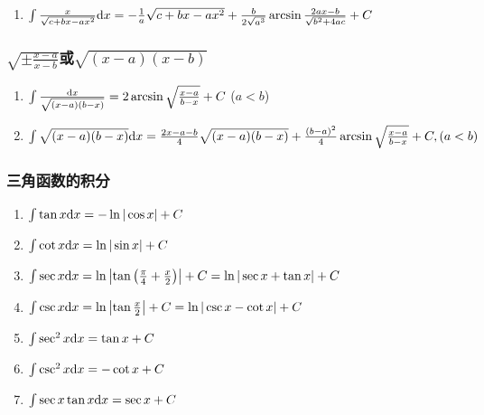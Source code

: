 \begin{footnotesize}
\begin{enumerate}
\item $ \int \frac{x}{\sqrt{c+bx-ax^2}} \mathrm{d} x = -\frac{1}{a}\sqrt{c+bx-ax^2} + \\ \frac{b}{2\sqrt{a^3}}\arcsin\frac{2ax-b}{\sqrt{b^2+4ac}} + C $

\end{enumerate}

\subsubsection*{$\sqrt{\pm\frac{x-a}{x-b}}$或$\sqrt{(x-a)(x-b)}$}

\begin{enumerate}

\item $ \int \frac{\mathrm{d} x}{\sqrt{(x-a)(b-x)}} = 2\arcsin\sqrt\frac{x-a}{b-x} + C$ ($a<b$)

\item $\int \sqrt{(x-a)(b-x)} \mathrm{d} x = \frac{2x-a-b}{4}\sqrt{(x-a)(b-x)} + \\
	\frac{(b-a)^2}{4}\arcsin\sqrt\frac{x-a}{b-x} + C, (a<b)$

\end{enumerate}

\subsubsection*{三角函数的积分}

\begin{enumerate}

\item $ \int \tan x \mathrm{d} x = -\ln|\cos x| + C $

\item $ \int \cot x \mathrm{d} x = \ln |\sin x| + C $

\item $ \int \sec x \mathrm{d} x = \ln \left| \tan\left( \frac{\pi}{4} + \frac{x}{2} \right) \right| + C = \ln |\sec x + \tan x| + C $

\item $ \int \csc x \mathrm{d} x = \ln \left| \tan\frac{x}{2} \right| + C = \ln |\csc x - \cot x| + C $

\item $ \int \sec^2 x \mathrm{d} x = \tan x + C $

\item $ \int \csc^2 x \mathrm{d} x = -\cot x + C $

\item $ \int \sec x \tan x \mathrm{d} x = \sec x + C $


\end{enumerate}
\end{footnotesize}
